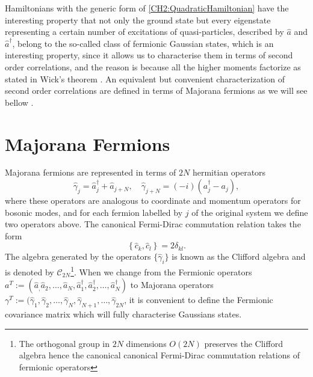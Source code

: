 \indent Hamiltonians with the generic form of \eqref{CH2:QuadraticHamiltonian} have the interesting property that not only the ground state but every eigenstate representing a certain number of excitations of quasi-particles, described by $\hat{a}$ and $\hat{a}^{\dagger}$, belong to the so-called class of fermionic Gaussian states, which is an interesting property, since it allows us to characterise them in terms of second order correlations, and the reason is because all the higher moments factorize as stated in Wick’s theorem \cite{westwanski_general_1973, molinari_notes_2017}. An equivalent but convenient characterization of second order correlations are defined in terms of Majorana fermions as we will see bellow .

\section{Majorana Fermions}
Majorana fermions are represented in terms of $2N$ hermitian operators 
\begin{equation}
\hat{\gamma}_{j}=\hat{a}_{j}^{\dagger}+\hat{a}_{j+N}, \quad \hat{\gamma}_{j+N}=(-i)\left(a_{j}^{\dagger}-a_{j}\right),
\label{CH2:majorana}
\end{equation}
where these operators are analogous to coordinate and momentum operators for bosonic modes, and for each fermion labelled by $j$ of the original system we define two operators above. The canonical Fermi-Dirac commutation relation takes the form
\begin{equation}
\left\{\hat{c}_{k},\hat{c}_{l}\right\}=2 \delta_{k l}.
\label{CH2:CAR_majorana}
\end{equation}
The algebra generated by the operators $\{\hat{\gamma}_i\}$ is known as the Clifford algebra and is denoted by $\mathcal{C}_{2N}$\footnote{The orthogonal group in $2N$ dimensions $O(2N)$ preserves the Clifford algebra hence the canonical  canonical Fermi-Dirac commutation relations of fermionic operators}. When we change from the Fermionic operators $a^{T}:=(\hat{a}_,\hat{a}_2,\ldots,\hat{a}_N, \hat{a}^{\dagger}_1,\hat{a}^{\dagger}_2,\ldots,\hat{a}^{\dagger}_N)$ to Majorana operators $\gamma^{T}:=(\hat{\gamma}_1,\hat{\gamma}_2,\ldots, \hat{\gamma}_N,\hat{\gamma}_{N+1},\ldots,\hat{\gamma}_{2N} $, it is convenient to define the Fermionic covariance matrix which will fully characterise Gaussians states.  

